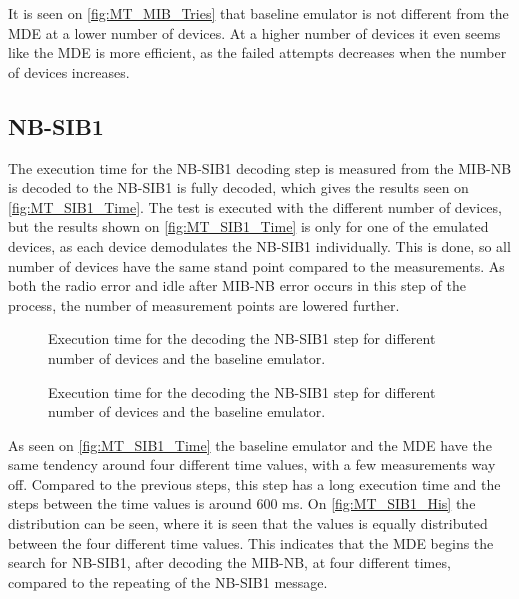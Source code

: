 It is seen on \autoref{fig:MT_MIB_Tries} that baseline emulator is not different from the MDE at a lower number of devices. At a higher number of devices it even seems like the MDE is more efficient, as the failed attempts decreases when the number of devices increases.

\subsection{NB-SIB1}
The execution time for the NB-SIB1 decoding step is measured from the MIB-NB is decoded to the NB-SIB1 is fully decoded, which gives the results seen on \autoref{fig:MT_SIB1_Time}. The test is executed with the different number of devices, but the results shown on \autoref{fig:MT_SIB1_Time} is only for one of the emulated devices, as each device demodulates the NB-SIB1 individually. This is done, so all number of devices have the same stand point compared to the measurements.
As both the radio error and idle after MIB-NB error occurs in this step of the process, the number of measurement points are lowered further.

\captionsetup{belowskip=0em}
\begin{minipage}{0.48\textwidth}
\begin{figure}[H]
\centering
\resizebox{\textwidth}{!}{
}
\caption{Execution time for the decoding the NB-SIB1 step for different number of devices and the baseline emulator.}
\label{fig:MT_SIB1_Time}
\end{figure}
\end{minipage}%
\hfill
\begin{minipage}{0.48\textwidth}
\begin{figure}[H]
\centering
\resizebox{\textwidth}{!}{
}
\caption{Execution time for the decoding the NB-SIB1 step for different number of devices and the baseline emulator.}
\label{fig:MT_SIB1_His}
\end{figure}
\end{minipage}
\captionsetup{belowskip=-1.5em}

As seen on \autoref{fig:MT_SIB1_Time} the baseline emulator and the MDE have the same tendency around four different time values, with a few measurements way off. Compared to the previous steps, this step has a long execution time and the steps between the time values is around 600 ms. On \autoref{fig:MT_SIB1_His}  the distribution can be seen, where it is seen that the values is equally distributed between the four different time values. This indicates that the MDE begins the search for NB-SIB1, after decoding the MIB-NB, at four different times, compared to the repeating of the NB-SIB1 message.


